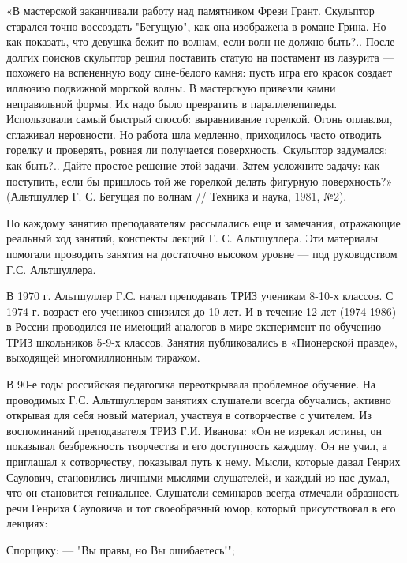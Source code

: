 «В мастерской заканчивали работу над памятником Фрези Грант. Скульптор
старался  точно  воссоздать "Бегущую",  как  она  изображена в  романе
Грина. Но  как показать,  что девушка  бежит по  волнам, если  волн не
должно быть?..  После долгих поисков скульптор  решил поставить статую
на постамент  из лазурита  — похожего  на вспененную  воду сине-белого
камня:  пусть  игра  его  красок  создает  иллюзию  подвижной  морской
волны. В  мастерскую привезли камни  неправильной формы. Их  надо было
превратить  в  параллелепипеды.  Использовали  самый  быстрый  способ:
выравнивание горелкой. Огонь оплавлял, сглаживал неровности. Но работа
шла медленно,  приходилось часто отводить горелку  и проверять, ровная
ли  получается поверхность.  Скульптор  задумался:  как быть?..  Дайте
простое решение  этой задачи.  Затем усложните задачу:  как поступить,
если  бы  пришлось  той  же  горелкой  делать  фигурную  поверхность?»
(Альтшуллер Г. С. Бегущая по волнам // Техника и наука, 1981, №2).




По  каждому  занятию  преподавателям   рассылались  еще  и  замечания,
отражающие реальный  ход занятий, конспекты лекций  Г. С. Альтшуллера.
Эти материалы помогали проводить  занятия на достаточно высоком уровне
— под руководством Г.С. Альтшуллера.

В  1970 г.  Альтшуллер  Г.С. начал  преподавать  ТРИЗ ученикам  8-10-х
классов.  С 1974  г. возраст  его  учеников снизился  до 10  лет. И  в
течение 12  лет (1974-1986)  в России  проводился не  имеющий аналогов
в  мире  эксперимент  по   обучению  ТРИЗ  школьников  5-9-х  классов.
Занятия публиковались в «Пионерской правде», выходящей многомиллионным
тиражом.

В 90-е  годы российская педагогика переоткрывала  проблемное обучение.
На проводимых  Г.С. Альтшуллером занятиях слушатели  всегда обучались,
активно открывая  для себя новый  материал, участвуя в  сотворчестве с
учителем.  Из воспоминаний  преподавателя  ТРИЗ Г.И.  Иванова: «Он  не
изрекал истины, он показывал безбрежность творчества и его доступность
каждому.  Он не  учил, а  приглашал к  сотворчеству, показывал  путь к
нему.  Мысли,  которые  давал  Генрих  Саулович,  становились  личными
мыслями  слушателей,  и  каждый  из   нас  думал,  что  он  становится
гениальнее.  Слушатели  семинаров   всегда  отмечали  образность  речи
Генриха Сауловича и тот своеобразный юмор, который присутствовал в его
лекциях:

Спорщику: — "Вы правы, но Вы ошибаетесь!";

